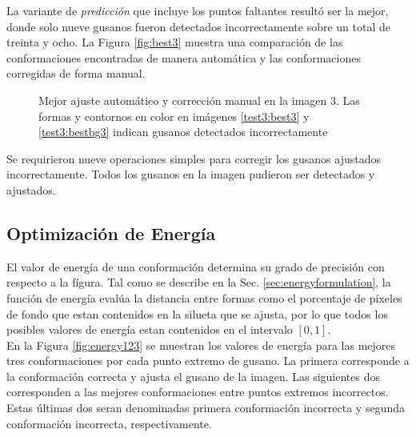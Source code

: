 La variante de \emph{predicci\'on} que incluye los puntos faltantes result\'o ser la mejor, donde solo nueve gusanos
fueron detectados incorrectamente sobre un total de treinta y ocho. La Figura \ref{fig:best3} 
muestra una comparaci\'on de las conformaciones encontradas de manera autom\'atica y 
las conformaciones corregidas de forma manual.

\begin{figure}[h!]
  \centering
\qquad
\qquad
  \label{best3:c}
\qquad
\caption[Mejor ajuste autom\'atico y correcci\'on manual en la imagen 3]{Mejor ajuste autom\'atico y correcci\'on manual en la imagen 3.
Las formas y contornos en color en im\'agenes \ref{test3:best3} y \ref{test3:bestbg3} indican gusanos detectados incorrectamente} 
 \end{figure}

Se requirieron nueve operaciones simples para corregir los gusanos ajustados
incorrectamente. Todos los gusanos en la imagen pudieron ser detectados
y ajustados.

\subsection{Optimizaci\'on de Energ\'ia}

El valor de energ\'ia de una conformaci\'on determina su grado de precisi\'on
con respecto a la f\'igura. Tal como se describe en la Sec. \ref{sec:energyformulation},
la funci\'on de energ\'ia eval\'ua la distancia entre formas como el porcentaje
de p\'ixeles de fondo que estan contenidos en la silueta que se ajusta, por lo que
todos los posibles valores de energ\'ia estan contenidos en el intervalo $[0,1]$.\\

En la Figura \ref{fig:energy123} se muestran los valores de energ\'ia para las mejores
tres conformaciones por cada punto extremo de gusano. La primera corresponde a la 
conformaci\'on correcta y ajusta el gusano de la imagen. Las siguientes dos
corresponden a las mejores conformaciones entre puntos extremos incorrectos. 
Estas \'ultimas dos seran denominadas primera conformaci\'on incorrecta y 
segunda conformaci\'on incorrecta, respectivamente.

